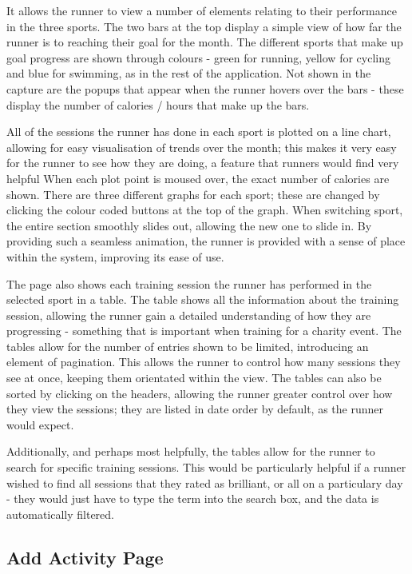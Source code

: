 \documentclass{article}[12pt,a4paper]
\begin{document}
It allows the runner to view a number of elements relating to their performance in the three sports. The two bars at the top display a simple view of how far the runner is to reaching their goal for the month. The different sports that make up goal progress are shown through colours - green for running, yellow for cycling and blue for swimming, as in the rest of the application. Not shown in the capture are the popups that appear when the runner hovers over the bars - these display the number of calories / hours that make up the bars. 

All of the sessions the runner has done in each sport is plotted on a line chart, allowing for easy visualisation of trends over the month; this makes it very easy for the runner to see how they are doing, a feature that runners would find very helpful When each plot point is moused over, the exact number of calories are shown. There are three different graphs for each sport; these are changed by clicking the colour coded buttons at the top of the graph. When switching sport, the entire section smoothly slides out, allowing the new one to slide in. By providing such a seamless animation, the runner is provided with a sense of place within the system, improving its ease of use.

The page also shows each training session the runner has performed in the selected sport in a table. The table shows all the information about the training session, allowing the runner gain a detailed understanding of how they are progressing - something that is important when training for a charity event. The tables allow for the number of entries shown to be limited, introducing an element of pagination. This allows the runner to control how many sessions they see at once, keeping them orientated within the view. The tables can also be sorted by clicking on the headers, allowing the runner greater control over how they view the sessions; they are listed in date order by default, as the runner would expect.

Additionally, and perhaps most helpfully, the tables allow for the runner to search for specific training sessions. This would be particularly helpful if a runner wished to find all sessions that they rated as brilliant, or all on a particulary day - they would just have to type the term into the search box, and the data is automatically filtered.

\clearpage

\subsection{Add Activity Page}
\end{document}
